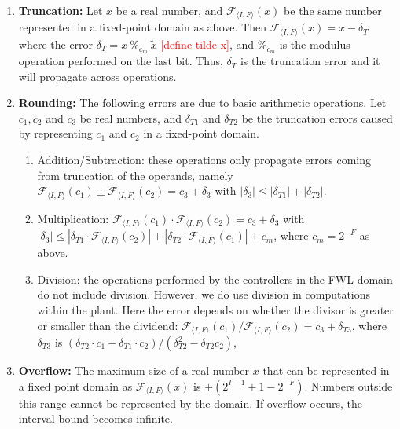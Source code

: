 \documentclass[twocolumn]{autart}    %
\renewcommand{\note}[1]{\textcolor{red}{[#1]}}
\begin{document}
\begin{enumerate}

\item {\bf Truncation:} Let $x$ be a real number, and $\mathcal{F}_{\langle
I,F \rangle}(x)$ be the same number represented in a fixed-point domain as
above.  Then $\mathcal{F}_{\langle I,F \rangle}(x) = x-\delta_T$ where the
error $ \delta_T=x\ \%_{c_m}\ \tilde x$ \note{define tilde x}, and $\%_{c_m}$ is the modulus
operation performed on the last bit. 
Thus, $\delta_T$ is the truncation error and it will propagate across
operations.
%
\item {\bf Rounding:} The following errors are due to basic arithmetic operations.  
Let $c_1, c_2$ and $c_3$ be real numbers, and $\delta_{T1}$ and $\delta_{T2}$ be
the truncation errors caused by representing $c_1$ and $c_2$ in a fixed-point domain.
%
\begin{enumerate}
%
\item Addition/Subtraction: these operations only propagate errors coming
from truncation of the operands, namely $\mathcal{F}_{\langle I,F
\rangle}(c_1) \pm \mathcal{F}_{\langle I,F \rangle}(c_2) = c_3 + \delta_3$
with $|\delta_3| \leq |\delta_{T1}| + |\delta_{T2}|$.
%
\item Multiplication: $\mathcal{F}_{\langle I,F \rangle}(c_1) \cdot
\mathcal{F}_{\langle I,F \rangle}(c_2) =  c_3 + \delta_3$ with $|\delta_3|
\leq |\delta_{T1}\cdot\mathcal{F}_{\langle I,F \rangle}(c_2)|\allowbreak +
|\delta_{T2}\cdot\mathcal{F}_{\langle I,F \rangle}(c_1)| + c_m$, where
$c_m=2^{-F}$ as above.
%
\item Division: the operations performed by the controllers in the FWL
domain do not include division.  However, we do use division in computations within the plant.  
Here the error depends on whether the divisor is greater or smaller than the dividend:  $\mathcal{F}_{\langle I,F
\rangle}(c_1) / \mathcal{F}_{\langle I,F \rangle}(c_2) = c_3 + \delta_{T3}$, 
where $\delta_{T3}$ is $(\delta_{T2}\cdot c_1 - \delta_{T1}\cdot
c_2)/(\delta_{T2}^2 - \delta_{T2} c_2)$,
%
\end{enumerate}

\item {\bf Overflow:}
The maximum size of a real number $x$ that can be represented in a fixed
point domain as $\mathcal{F}_{\langle I,F \rangle}(x)$ is $\pm
(2^{I-1}+1-2^{-F})$.  Numbers outside this range cannot be represented by
the domain.  If overflow occurs, the interval bound becomes infinite.

\end{enumerate}
\end{document}
